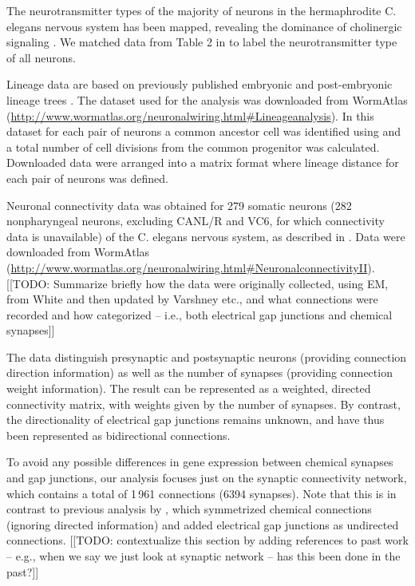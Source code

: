 \documentclass[10pt,letterpaper]{article}
\begin{document}
The neurotransmitter types of the majority of neurons in the hermaphrodite C. elegans nervous system has been mapped, revealing the dominance of cholinergic signaling \cite{Pereira:2015er}.
We matched data from Table 2 in \citet{Pereira:2015er} to label the neurotransmitter type of all neurons.

Lineage data are based on previously published embryonic and  post-embryonic lineage trees \citep{Sulston1977, Sulston1983}.
The dataset used for the analysis was downloaded from WormAtlas (\url{http://www.wormatlas.org/neuronalwiring.html#Lineageanalysis}).
In this dataset for each pair of neurons a common ancestor cell was identified using and a total number of cell divisions from the common progenitor was calculated.
Downloaded data were arranged into a matrix format where lineage distance for each pair of neurons was defined. %

Neuronal connectivity data was obtained for 279 somatic neurons (282 nonpharyngeal neurons, excluding CANL/R and VC6, for which connectivity data is unavailable) of the C. elegans nervous system, as described in \citet{Varshney2011}.
Data were downloaded from WormAtlas (\url{http://www.wormatlas.org/neuronalwiring.html#NeuronalconnectivityII}).
[[TODO: Summarize briefly how the data were originally collected, using EM, from White and then updated by Varshney etc., and what connections were recorded and how categorized -- i.e., both electrical gap junctions and chemical synapses]]

The data distinguish presynaptic and postsynaptic neurons (providing connection direction information) as well as the number of synapses (providing connection weight information).
The result can be represented as a weighted, directed connectivity matrix, with weights given by the number of synapses.
By contrast, the directionality of electrical gap junctions remains unknown, and have thus been represented as bidirectional connections.

To avoid any possible differences in gene expression between chemical synapses and gap junctions, our analysis focuses just on the synaptic connectivity network, which contains a total of 1\,961 connections (6394 synapses).
Note that this is in contrast to previous analysis by \citet{Towlson:2013gf}, which symmetrized chemical connections (ignoring directed information) and added electrical gap junctions as undirected connections.
[[TODO: contextualize this section by adding references to past work -- e.g., when we say we just look at synaptic network -- has this been done in the past?]]
\end{document}
